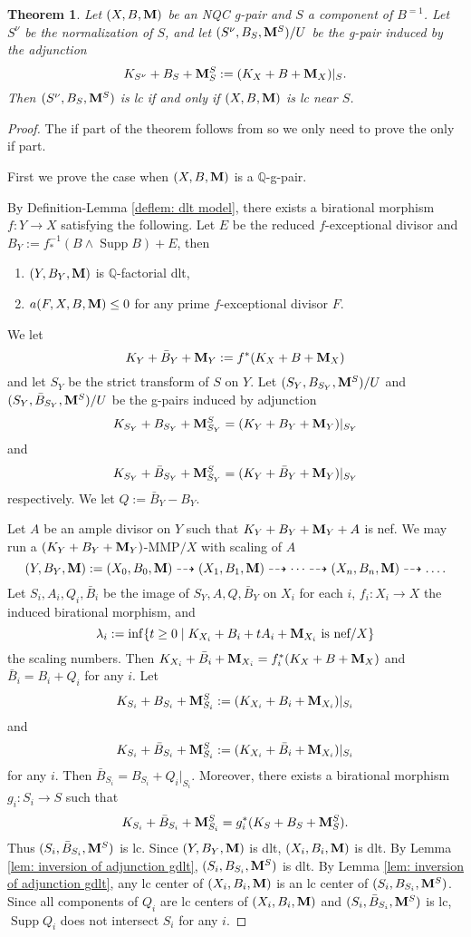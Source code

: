 \documentclass[11pt]{amsart}
\numberwithin{equation}{section}
\newcommand{\Mm}{{\bf{M}}}
\newcommand{\Qq}{\mathbb{Q}}
\newcommand{\Supp}{\operatorname{Supp}}
\newtheorem{thm}{Theorem}[subsection]
\theoremstyle{definition}
\theoremstyle{definition}
\theoremstyle{definition}
\begin{document}
\begin{thm}\label{thm: inversion of adjunction}
Let $(X,B,\Mm)$ be an NQC g-pair and $S$ a component of $B^{=1}$. Let $S^\nu$ be the normalization of $S$, and let $(S^\nu,B_S,\Mm^S)/U$ be the g-pair induced by the adjunction
$$K_{S^\nu}+B_S+\Mm^S_S:=(K_X+B+\Mm_X)|_S.$$
Then $(S^\nu,B_S,\Mm^S)$ is lc if and only if $(X,B,\Mm)$ is lc near $S$.
\end{thm}
\begin{proof}
The if part of the theorem follows from \cite[Definition 4.7]{BZ16} so we only need to prove the only if part. 

First we prove the case when $(X,B,\Mm)$ is a $\Qq$-g-pair. 

By Definition-Lemma \ref{deflem: dlt model}, there exists a birational morphism $f: Y\rightarrow X$ satisfying the following. Let $E$ be the reduced $f$-exceptional divisor and $B_Y:=f^{-1}_*(B\wedge\Supp B)+E$, then
\begin{enumerate}
    \item $(Y,B_Y,\Mm)$ is $\Qq$-factorial dlt,
    \item $a(F,X,B,\Mm)\leq 0$ for any prime $f$-exceptional divisor $F$.
\end{enumerate}
We let
$$K_Y+\bar B_Y+\Mm_Y:=f^*(K_X+B+\Mm_X)$$
and let $S_Y$ be the strict transform of $S$ on $Y$. Let $(S_Y,B_{S_Y},\Mm^S)/U$ and $(S_Y,\bar B_{S_Y},\Mm^S)/U$ be the g-pairs induced by adjunction
$$K_{S_Y}+B_{S_Y}+\Mm^S_{S_Y}=(K_Y+B_Y+\Mm_Y)|_{S_Y}$$
and
$$K_{S_Y}+\bar B_{S_Y}+\Mm^S_{S_Y}=(K_Y+\bar B_Y+\Mm_Y)|_{S_Y}$$
respectively. We let $Q:=\bar B_Y-B_Y$. 

Let $A$ be an ample divisor on $Y$ such that $K_Y+B_Y+\Mm_Y+A$ is nef. We may run a $(K_Y+B_Y+\Mm_Y)$-MMP$/X$ with scaling of $A$
$$(Y,B_Y,\Mm):=(X_0,B_0,\Mm)\dashrightarrow (X_1,B_1,\Mm)\dashrightarrow\dots\dashrightarrow (X_n,B_n,\Mm)\dashrightarrow\dots.$$
Let $S_i,A_i,Q_i,\bar B_i$ be the image of $S_Y,A,Q,\bar B_Y$ on $X_i$ for each $i$, $f_i: X_i\rightarrow X$ the induced birational morphism, and 
$$\lambda_i:=\inf\{t\geq 0\mid K_{X_i}+B_i+tA_i+\Mm_{X_i}\text{ is nef}/X\}$$
the scaling numbers. Then $K_{X_i}+\bar B_i+\Mm_{X_i}=f_i^*(K_X+B+\Mm_X)$ and $\bar B_i=B_i+Q_i$ for any $i$. Let
$$K_{S_i}+B_{S_i}+\Mm^S_{S_i}:=(K_{X_i}+B_i+\Mm_{X_i})|_{S_i}$$
and
$$K_{S_i}+\bar B_{S_i}+\Mm^S_{S_i}:=(K_{X_i}+\bar B_i+\Mm_{X_i})|_{S_i}$$
for any $i$. Then $\bar B_{S_i}=B_{S_i}+Q_i|_{S_i}$. Moreover, there exists a birational morphism $g_i: S_i\rightarrow S$ such that
$$K_{S_i}+\bar B_{S_i}+\Mm^S_{S_i}=g_i^*(K_S+B_S+\Mm^S_S).$$
Thus $(S_i,\bar B_{S_i},\Mm^S)$ is lc. Since $(Y,B_Y,\Mm)$ is dlt, $(X_i,B_i,\Mm)$ is dlt. By Lemma \ref{lem: inversion of adjunction gdlt}, $(S_i,B_{S_i},\Mm^S)$ is dlt. By Lemma \ref{lem: inversion of adjunction gdlt}, any lc center of $(X_i,B_i,\Mm)$ is an lc center of $(S_i,B_{S_i},\Mm^S)$. Since all components of $Q_i$ are lc centers of $(X_i,B_i,\Mm)$ and $(S_i,\bar B_{S_i},\Mm^S)$ is lc, $\Supp Q_i$ does not intersect $S_i$ for any $i$.


\end{proof}
\end{document}
